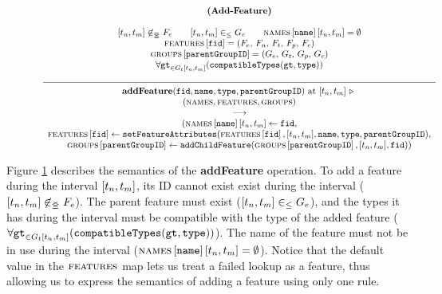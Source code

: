 \begin{figure}[h]
    \renewcommand{\arraystretch}{1.1}
    \sossize$$\begin{array}{c}
      \ntyperule{Add-Feature}
      {\\
        \interval{t_n}{t_m} \not \innr F_e \qquad
        \interval{t_n}{t_m} \inn G_e \qquad
        \lookup{\names{}}{\var{name}}\interval{t_n}{t_m} = \emptyset \\
        \lookup{\features{}}{\var{fid}} = \left( F_e,\, F_n,\, F_t,\, F_p,\, F_c \right) \\
        \lookup{\groups{}}{\var{parentGroupID}} = \left(G_e,\, G_t , \, G_p,\, G_c \right)\\
        \forall \var{gt}_{\in G_t\interval{t_n}{t_m}} (\var{compatibleTypes}(\var{gt}, \var{type})) \\
      }
      {
        \textbf{addFeature}(\var{fid}, \var{name}, \var{type}, \var{parentGroupID})\text{ at }\interval{t_n}{t_m} \shove \\
         (\names{}, \features{}, \groups{})\\
        \transition\\
        (\lookup{\names{}}{\var{name}}\interval{t_n}{t_m} \assign \var{fid},  \\
        {\lookup{\features{}}{\var{fid}}} \assign 
        \var{setFeatureAttributes}(\lookup{\features{}}{\var{fid}}, \interval{t_n}{t_m}, 
        \var{name}, \var{type}, \var{parentGroupID}),\\
        {\lookup{\groups{}}{\var{parentGroupID}}} \assign 
        \var{addChildFeature}(\lookup{\groups{}}{\var{parentGroupID}}, \interval{t_n}{t_m}, \var{fid}))
    }
    \end{array}$$
    \caption{\label{rule:add-feature}}
\end{figure}

Figure \ref{rule:add-feature}  describes the semantics of the \textbf{addFeature} operation. 
To add a feature during the interval $\interval{t_n}{t_m}$, its ID cannot exist exist during the interval ($\interval{t_n}{t_m} \not \innr F_e$). The parent feature must exist ($\interval{t_n}{t_m} \inn G_e$), and the types it has during the interval must be compatible with the type of the 
added feature ($\forall \var{gt}_{\in G_t\interval{t_n}{t_m}} (\var{compatibleTypes}(\var{gt}, \var{type}))$). The name of the feature must not be in use during the interval ($\lookup{\names{}}{\var{name}}\interval{t_n}{t_m} = \emptyset$). Notice that the default value in the $\textsc{features}{}$ map lets us treat a failed lookup as a feature, thus allowing us to express the semantics of adding a feature using only one rule. 

